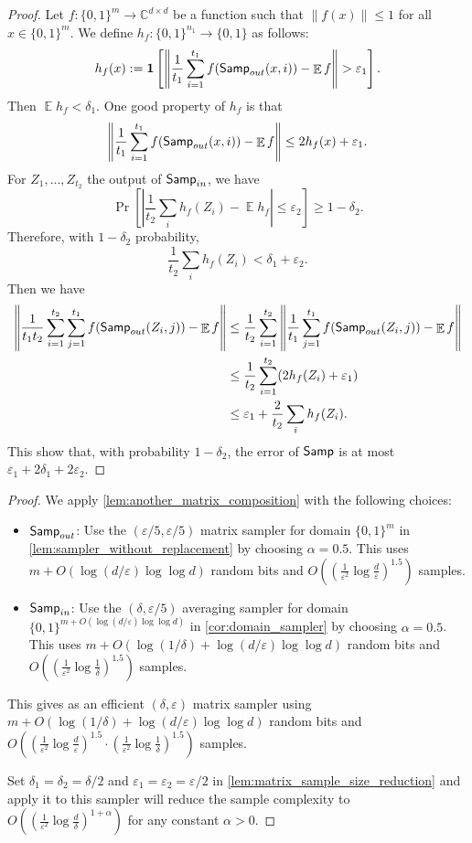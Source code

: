 \documentclass[10pt,a4paper]{article}
\newcommand{\C}{\mathbb{C}}
\DeclareMathOperator*{\E}{\mathbb{E}}
\newcommand{\eps}{\varepsilon}
\newcommand{\1}{\mathbbm{1}}
\newcommand{\norm}[1]{\left\lVert #1\right\rVert}
\newcommand{\abs}[1]{\left|#1\right| }
\newcommand{\zo}{\{0, 1\}}
\newcommand{\Smp}{\textup{\textsf{Samp}}}
\begin{document}
\begin{proof}
    Let $f : \zo^m \to \C^{d \times d}$ be a function such that $\|f(x)\| \leq 1$ for all $x \in \zo^m$.
    We define $h_f:\zo^{n_1} \to \{0, 1\}$ as follows: \[
        h_f(x) := \mathbf{1}\left[\norm{\frac{1}{t_1}\sum_{i=1}^{t_1} f(\Smp_{out}(x, i)) - \E f} > \eps_1\right].
    \] Then $\E h_f < \delta_1$. One good property of $h_f$ is that \[
        \norm{\frac{1}{t_1}\sum_{i=1}^{t_1} f(\Smp_{out}(x, i)) - \E f} \le 2h_f(x) + \eps_1.
    \]
    For $Z_1, \dots, Z_{t_2}$ the output of $\Smp_{in}$, we have     \[
    \Pr
    \left[ \abs{\frac{1}{t_2}  \sum_i h_f(Z_i) - \E h_f} \leq \varepsilon_2 \right]
    \geq 1 - \delta_2.
    \]
    Therefore, with $1 - \delta_2$ probability, \[
        {\frac{1}{t_2}  \sum_i h_f(Z_i)} < \delta_1 + \eps_2.
    \]
    Then we have 
    \begin{align*}
        \norm{\frac{1}{t_1t_2}\sum_{i=1}^{t_2}\sum_{j=1}^{t_1}f(\Smp_{out}(Z_i, j)) - \E f} &\le \frac{1}{t_2}\sum_{i=1}^{t_2} \norm{\frac{1}{t_1} \sum_{j=1}^{t_1} f(\Smp_{out}(Z_i, j)) - \E f}  \\
        &\le \frac{1}{t_2}\sum_{i=1}^{t_2} (2h_f(Z_i) + \eps_1) \\
        &\le \eps_1 +  {\frac{2}{t_2}  \sum_i h_f(Z_i)}.
    \end{align*}
    This show that, with probability $1 - \delta_2$, the error of $\Smp$ is at most $\eps_1 + 2\delta_1 + 2\eps_2$.
\end{proof}
\samplerWithReplacement*
\begin{proof}
    We apply \cref{lem:another_matrix_composition} with the following choices:
    \begin{itemize}
        \item $\Smp_{out}$: Use the $(\eps / 5, \eps / 5)$ matrix sampler for domain $\zo^m$ in \cref{lem:sampler_without_replacement} by choosing $\alpha = 0.5$. This uses $m + O( \log(d / \eps) \log\log d)$ random bits and $O((\frac{1}{\eps^2}\log\frac{d}{\eps})^{1.5})$ samples.
        \item $\Smp_{in}$: Use the $(\delta, \eps / 5)$ averaging sampler for domain $\zo^{m + O( \log(d / \eps) \log\log d)}$ in \cref{cor:domain_sampler} by choosing $\alpha = 0.5$. This uses $m + O( \log (1 / \delta) + \log(d / \eps) \log\log d)$ random bits and $O((\frac{1}{\eps^2}\log\frac{1}{\delta})^{1.5})$ samples.
    \end{itemize}
    This gives as an efficient $(\delta, \eps)$ matrix sampler using $m + O( \log (1 / \delta) + \log(d / \eps) \log\log d)$ random bits and $O((\frac{1}{\eps^2}\log\frac{d}{\eps})^{1.5} \cdot (\frac{1}{\eps^2}\log\frac{1}{\delta})^{1.5})$ samples.   
    
    Set $\delta_1 = \delta_2 = \delta / 2$ and $\eps_1 = \eps_2 = \eps / 2$ in  \cref{lem:matrix_sample_size_reduction} and apply it to this sampler will reduce the sample complexity to $O((\frac{1}{\eps^2}\log\frac{d}{\delta})^{1 + \alpha})$ for any constant $\alpha > 0$.
\end{proof}
\end{document}

